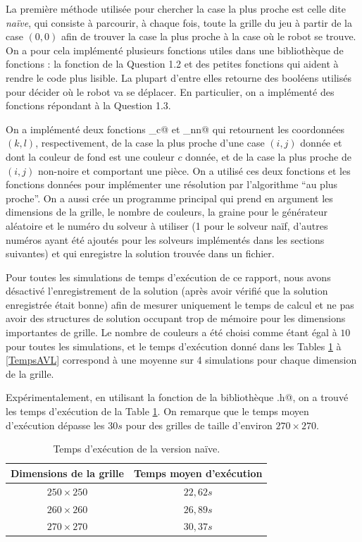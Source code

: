 \documentclass[a4paper,12pt]{article}
\numberwithin{equation}{section}
\begin{document}
La première méthode utilisée pour chercher la case la plus proche est celle dite \emph{naïve}, qui consiste à parcourir, à chaque fois, toute la grille du jeu à partir de la case $(0, 0)$ afin de trouver la case la plus proche à la case où le robot se trouve. On a pour cela implémenté plusieurs fonctions utiles dans une bibliothèque de fonctions : la fonction \verb@PlusCourtChemin@ de la Question 1.2 et des petites fonctions qui aident à rendre le code plus lisible. La plupart d'entre elles retourne des booléens utilisés pour décider où le robot va se déplacer. En particulier, on a implémenté des fonctions répondant à la Question 1.3.

On a implémenté deux fonctions \verb@RechercheCaseNaif_c@ et \verb@RechercheCaseNaif_nn@ qui retournent les coordonnées $(k, l)$, respectivement, de la case la plus proche d'une case $(i, j)$ donnée et dont la couleur de fond est une couleur $c$ donnée, et de la case la plus proche de $(i, j)$ non-noire et comportant une pièce. On a utilisé ces deux fonctions et les fonctions données pour implémenter une résolution par l'algorithme ``au plus proche''. On a aussi crée un programme principal \verb@Solveur@ qui prend en argument les dimensions de la grille, le nombre de couleurs, la graine pour le générateur aléatoire et le numéro du solveur à utiliser (1 pour le solveur naïf, d'autres numéros ayant été ajoutés pour les solveurs implémentés dans les sections suivantes) et qui enregistre la solution trouvée dans un fichier.

Pour toutes les simulations de temps d'exécution de ce rapport, nous avons désactivé l'enregistrement de la solution (après avoir vérifié que la solution enregistrée était bonne) afin de mesurer uniquement le temps de calcul et ne pas avoir des structures de solution occupant trop de mémoire pour les dimensions importantes de grille. Le nombre de couleurs a été choisi comme étant égal à $10$ pour toutes les simulations, et le temps d'exécution donné dans les Tables \ref{TempsNaive} à \ref{TempsAVL} correspond à une moyenne sur 4 simulations pour chaque dimension de la grille.

Expérimentalement, en utilisant la fonction \verb@clock@ de la bibliothèque \verb@time.h@, on a trouvé les temps d'exécution de la Table \ref{TempsNaive}. On remarque que le temps moyen d'exécution dépasse les $30 s$ pour des grilles de taille d'environ $270 \times 270$.

\begin{table}[ht]
\centering
\begin{tabular}{cc}
\hline\hline
Dimensions de la grille & Temps moyen d'exécution \tabularnewline
\hline
$250 \times 250$ & $22,62 s$ \tabularnewline
$260 \times 260$ & $26,89 s$ \tabularnewline
$270 \times 270$ & $30,37 s$ \tabularnewline
\hline\hline
\end{tabular}
\caption{Temps d'exécution de la version naïve.}
\label{TempsNaive}
\end{table}
\end{document}
